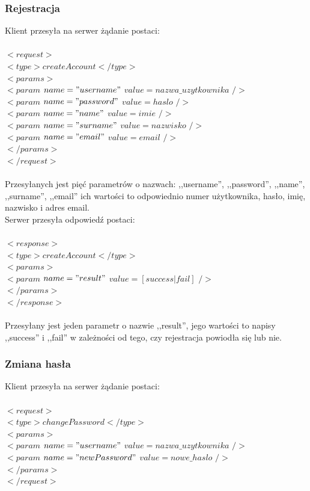 \documentclass[a4paper,12pt]{article}
\begin{document}
\subsubsection[Rejestracja]{Rejestracja}
Klient przesyła na serwer żądanie postaci:\\\\
\noindent  $<request>$\\
\indent    $<type>createAccount</type>$\\
\indent    $<params>$\\
\indent \indent $<param$ $name="username"$ $value=nazwa\_uzytkownika$ $/>$\\
\indent \indent $<param$ $name="password"$ $value=haslo$ $/>$\\
\indent \indent $<param$ $name="name"$ $value=imie$ $/>$\\
\indent \indent $<param$ $name="surname"$ $value=nazwisko$ $/>$\\
\indent \indent $<param$ $name="email"$ $value=email$ $/>$\\
\indent    $</params>$\\
$</request>$\\\\

\noindent Przesyłanych jest pięć parametrów o nazwach: ,,username'', ,,password'', ,,name'', ,,surname'', ,,email'' ich wartości to odpowiednio numer użytkownika, hasło, imię, nazwisko i adres email.\\
Serwer przesyła odpowiedź postaci:\\\\
\noindent  $<response>$\\
\indent    $<type>createAccount</type>$\\
\indent    $<params>$\\
\indent \indent $<param$ $name="result"$ $value=[success|fail]$ $/>$\\
\indent    $</params>$\\
$</response>$\\\\
\noindent Przesyłany jest jeden parametr o nazwie ,,result'', jego wartości to napisy ,,success'' i ,,fail'' w zależności od tego, czy rejestracja powiodła się lub nie.

\subsubsection[Zmiana hasła]{Zmiana hasła}
Klient przesyła na serwer żądanie postaci:\\\\
\noindent  $<request>$\\
\indent    $<type>changePassword</type>$\\
\indent    $<params>$\\
\indent \indent $<param$ $name="username"$ $value=nazwa\_uzytkownika$ $/>$\\
\indent \indent $<param$ $name="newPassword"$ $value=nowe\_haslo$ $/>$\\
\indent    $</params>$\\
$</request>$\\\\
\end{document}
